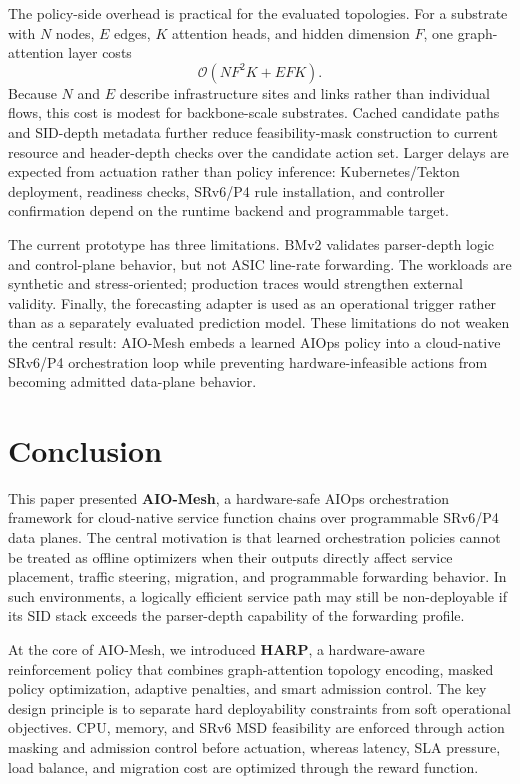 \documentclass[final,5p]{elsarticle}
\begin{document}
The policy-side overhead is practical for the evaluated topologies. For a substrate with \(N\) nodes, \(E\) edges, \(K\) attention heads, and hidden dimension \(F\), one graph-attention layer costs
\begin{equation}
    \mathcal{O}(NF^2K + EFK).
\end{equation}
Because \(N\) and \(E\) describe infrastructure sites and links rather than individual flows, this cost is modest for backbone-scale substrates. Cached candidate paths and SID-depth metadata further reduce feasibility-mask construction to current resource and header-depth checks over the candidate action set. Larger delays are expected from actuation rather than policy inference: Kubernetes/Tekton deployment, readiness checks, SRv6/P4 rule installation, and controller confirmation depend on the runtime backend and programmable target.

The current prototype has three limitations. BMv2 validates parser-depth logic and control-plane behavior, but not ASIC line-rate forwarding. The workloads are synthetic and stress-oriented; production traces would strengthen external validity. Finally, the forecasting adapter is used as an operational trigger rather than as a separately evaluated prediction model. These limitations do not weaken the central result: AIO-Mesh embeds a learned AIOps policy into a cloud-native SRv6/P4 orchestration loop while preventing hardware-infeasible actions from becoming admitted data-plane behavior.


\section{Conclusion}
\label{sec:conclusion}
This paper presented \textbf{AIO-Mesh}, a hardware-safe AIOps orchestration framework for cloud-native service function chains over programmable SRv6/P4 data planes. The central motivation is that learned orchestration policies cannot be treated as offline optimizers when their outputs directly affect service placement, traffic steering, migration, and programmable forwarding behavior. In such environments, a logically efficient service path may still be non-deployable if its SID stack exceeds the parser-depth capability of the forwarding profile.

At the core of AIO-Mesh, we introduced \textbf{HARP}, a hardware-aware reinforcement policy that combines graph-attention topology encoding, masked policy optimization, adaptive penalties, and smart admission control. The key design principle is to separate hard deployability constraints from soft operational objectives. CPU, memory, and SRv6 MSD feasibility are enforced through action masking and admission control before actuation, whereas latency, SLA pressure, load balance, and migration cost are optimized through the reward function.
\end{document}
